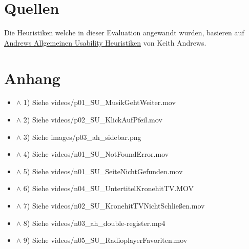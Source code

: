 \documentclass{article}
\begin{document}
	\section{Quellen}
	Die Heuristiken welche in dieser Evaluation angewandt wurden, basieren auf \href{https://cdn.isds.tugraz.at/hci/reports/ss2017/g3-02-tugraz-en/heplan/heuristics.pdf}{Andrews Allgemeinen Usability Heuristiken} von Keith Andrews.
	\section{Anhang}
	\begin{itemize}
		\item[]{\label{sec:Anhang1}\hyperref[ssub:radioplayer1]{$\wedge$} 1) Siehe videos/p01\_SU\_MusikGehtWeiter.mov}
		\item[]{\label{sec:Anhang2}\hyperref[ssub:radioplayer2]{$\wedge$} 2) Siehe videos/p02\_SU\_KlickAufPfeil.mov}
		\item[]{\label{sec:Anhang3}\hyperref[ssub:sidebar]{$\wedge$} 3) Siehe images/p03\_ah\_sidebar.png}
		\item[]{\label{sec:Anhang4}\hyperref[ssub:notfound1]{$\wedge$} 4) Siehe videos/n01\_SU\_NotFoundError.mov}
		\item[]{\label{sec:Anhang5}\hyperref[ssub:notfound2]{$\wedge$} 5) Siehe videos/n01\_SU\_SeiteNichtGefunden.mov}
		\item[]{\label{sec:Anhang6}\hyperref[ssub:tvmobile1]{$\wedge$} 6) Siehe videos/n04\_SU\_UntertitelKronehitTV.MOV}
		\item[]{\label{sec:Anhang7}\hyperref[ssub:tvmobile2]{$\wedge$} 7) Siehe videos/n02\_SU\_KronehitTVNichtSchließen.mov}
		\item[]{\label{sec:Anhang8}\hyperref[ssub:register]{$\wedge$} 8) Siehe videos/n03\_ah\_double-register.mp4}
		\item[]{\label{sec:Anhang9}\hyperref[ssub:radio1]{$\wedge$} 9) Siehe videos/n05\_SU\_RadioplayerFavoriten.mov}
	\end{itemize}
























  
\end{document}
